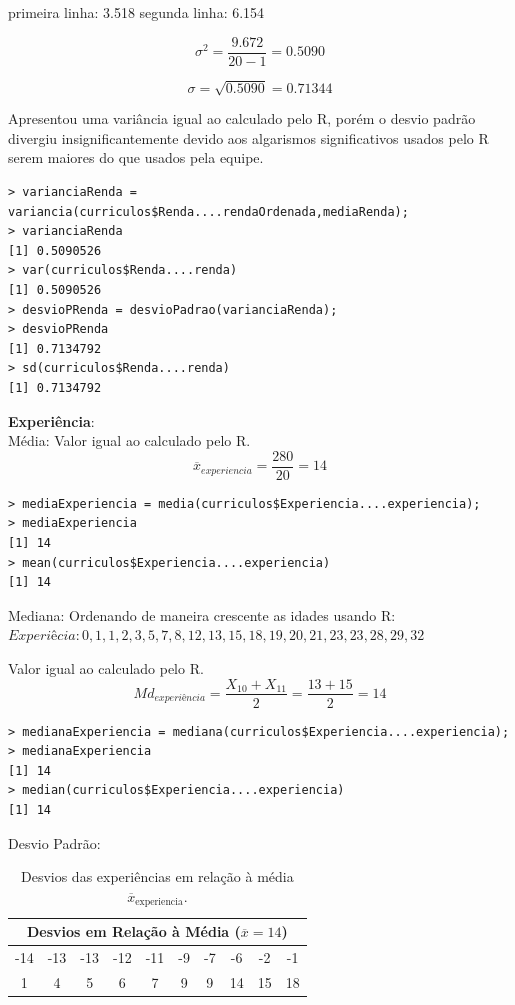 \documentclass[a4paper,11pt]{article}
\begin{document}
\begin{description}[leftmargin=*]
primeira linha: 3.518
segunda linha: 6.154

\[\sigma^2 = \frac{ 9.672}{20-1} = 0.5090\]

\[\sigma = \sqrt{0.5090} = 0.71344\]

Apresentou uma variância igual ao calculado pelo R, porém o desvio padrão divergiu insignificantemente devido aos algarismos significativos usados pelo R serem maiores do que usados pela equipe.

\begin{lstlisting}
> varianciaRenda = variancia(curriculos$Renda....rendaOrdenada,mediaRenda);
> varianciaRenda
[1] 0.5090526
> var(curriculos$Renda....renda)
[1] 0.5090526
> desvioPRenda = desvioPadrao(varianciaRenda);
> desvioPRenda
[1] 0.7134792
> sd(curriculos$Renda....renda)
[1] 0.7134792
\end{lstlisting}

\item \textbf{Experiência}:\\
Média:
Valor igual ao calculado pelo R.
\[\overline{x}_{experiencia} = \frac{280}{20} = 14\]

\begin{lstlisting}
> mediaExperiencia = media(curriculos$Experiencia....experiencia);
> mediaExperiencia
[1] 14
> mean(curriculos$Experiencia....experiencia)
[1] 14
\end{lstlisting}

Mediana:
Ordenando de maneira crescente as idades usando R: \\
$Experiêcia: 0,  1,  1,  2,  3,  5,  7,  8, 12, 13, 15, 18, 19, 20, 21, 23, 23, 28, 29, 32$

Valor igual ao calculado pelo R.
\[Md_{experiência} = \frac{X_{10}+X_{11}}{2} = \frac{13+15}{2} = 14\]

\begin{lstlisting}
> medianaExperiencia = mediana(curriculos$Experiencia....experiencia);
> medianaExperiencia
[1] 14
> median(curriculos$Experiencia....experiencia)
[1] 14
\end{lstlisting}

Desvio Padrão:

\begin{table}[H]
    \centering
    \begin{tabular}{cccccccccc}
        \hline
        \multicolumn{10}{c}{\textbf{Desvios em Relação à Média ($\overline{x} = 14$)}}\\
        \hline
        -14 & -13 & -13 & -12 & -11 & -9 & -7 & -6 & -2 & -1 \\ 
         1 & 4 & 5 & 6 & 7 & 9 & 9 & 14 & 15 & 18 \\
        \hline
    \end{tabular}
    \caption{Desvios das experiências em relação à média $\overline{x}_{\text{experiencia}}$.}
    \label{tab:desvios_experiencia}
\end{table}



\end{description}
\end{document}
